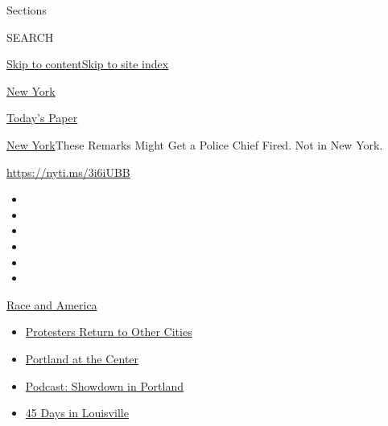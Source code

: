 Sections

SEARCH

\protect\hyperlink{site-content}{Skip to
content}\protect\hyperlink{site-index}{Skip to site index}

\href{https://www.nytimes3xbfgragh.onion/section/nyregion}{New York}

\href{https://myaccount.nytimes3xbfgragh.onion/auth/login?response_type=cookie\&client_id=vi}{}

\href{https://www.nytimes3xbfgragh.onion/section/todayspaper}{Today's
Paper}

\href{/section/nyregion}{New York}\textbar{}These Remarks Might Get a
Police Chief Fired. Not in New York.

\url{https://nyti.ms/3i6iUBB}

\begin{itemize}
\item
\item
\item
\item
\item
\item
\end{itemize}

\href{https://www.nytimes3xbfgragh.onion/news-event/george-floyd-protests-minneapolis-new-york-los-angeles?action=click\&pgtype=Article\&state=default\&region=TOP_BANNER\&context=storylines_menu}{Race
and America}

\begin{itemize}
\tightlist
\item
  \href{https://www.nytimes3xbfgragh.onion/2020/07/26/us/protests-portland-seattle-trump.html?action=click\&pgtype=Article\&state=default\&region=TOP_BANNER\&context=storylines_menu}{Protesters
  Return to Other Cities}
\item
  \href{https://www.nytimes3xbfgragh.onion/2020/07/24/us/portland-oregon-protests-white-race.html?action=click\&pgtype=Article\&state=default\&region=TOP_BANNER\&context=storylines_menu}{Portland
  at the Center}
\item
  \href{https://www.nytimes3xbfgragh.onion/2020/07/23/podcasts/the-daily/portland-protests.html?action=click\&pgtype=Article\&state=default\&region=TOP_BANNER\&context=storylines_menu}{Podcast:
  Showdown in Portland}
\item
  \href{https://www.nytimes3xbfgragh.onion/interactive/2020/07/16/us/black-lives-matter-protests-louisville-breonna-taylor.html?action=click\&pgtype=Article\&state=default\&region=TOP_BANNER\&context=storylines_menu}{45
  Days in Louisville}
\end{itemize}

